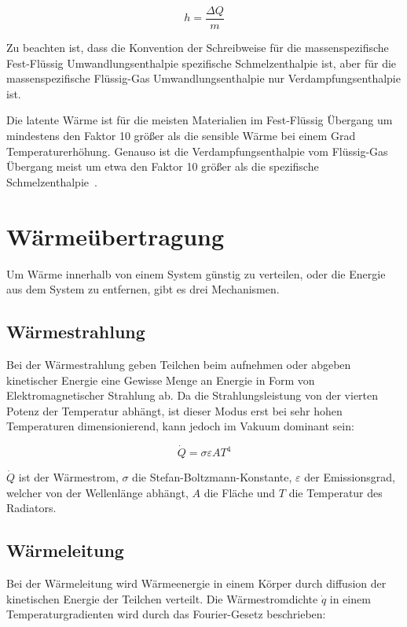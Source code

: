 \begin{equation}
    h = \frac{\Delta Q}{m}
\end{equation}

Zu beachten ist, dass die Konvention der Schreibweise für die massenspezifische Fest-Flüssig Umwandlungsenthalpie spezifische Schmelzenthalpie ist,
aber für die massenspezifische Flüssig-Gas Umwandlungsenthalpie nur Verdampfungsenthalpie ist.

Die latente Wärme ist für die meisten Materialien im Fest-Flüssig Übergang um mindestens den Faktor 10 größer als die sensible Wärme bei
einem Grad Temperaturerhöhung. Genauso ist die Verdampfungsenthalpie vom Flüssig-Gas Übergang meist um etwa den Faktor 10 größer als die 
spezifische Schmelzenthalpie~\cite{fusion-vaporization}.

\section{Wärmeübertragung}\label{sec:waermeuebertragung}

Um Wärme innerhalb von einem System günstig zu verteilen, oder die Energie aus dem System zu entfernen, gibt es drei Mechanismen.

\subsection{Wärmestrahlung}\label{sec:strahlung}

Bei der Wärmestrahlung geben Teilchen beim aufnehmen oder abgeben kinetischer Energie eine Gewisse Menge an Energie in Form
von Elektromagnetischer Strahlung ab. Da die Strahlungsleistung von der vierten Potenz der Temperatur
abhängt, ist dieser Modus erst bei sehr hohen Temperaturen dimensionierend, kann jedoch im Vakuum dominant sein:

\begin{equation}
    \label{eq:radiation}
    \dot{Q}=\sigma\varepsilon A T^{4}
\end{equation}

$\dot{Q}$ ist der Wärmestrom, $\sigma$ die Stefan-Boltzmann-Konstante, $\varepsilon$ der Emissionsgrad, welcher von der Wellenlänge
abhängt, $A$ die Fläche und $T$ die Temperatur des Radiators.

\subsection{Wärmeleitung}\label{sec:waermeleitung}

Bei der Wärmeleitung wird Wärmeenergie in einem Körper durch diffusion der kinetischen Energie der Teilchen verteilt.
Die Wärmestromdichte $\dot{q}$ in einem Temperaturgradienten wird durch das Fourier-Gesetz beschrieben:

